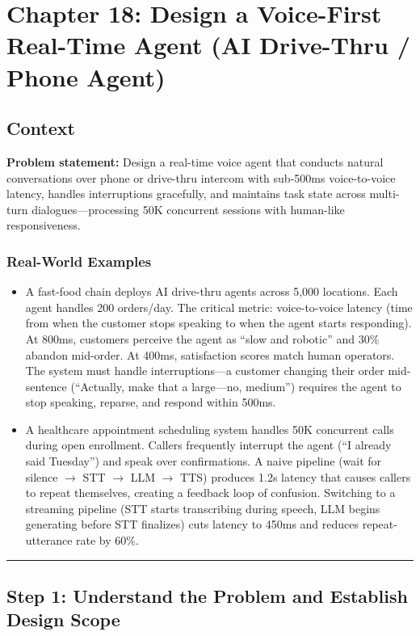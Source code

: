 \chapter{Chapter 18: Design a Voice-First Real-Time Agent (AI Drive-Thru / Phone Agent)}

\section*{Context}
\textbf{Problem statement:} Design a real-time voice agent that conducts natural conversations over phone or drive-thru intercom with sub-500ms voice-to-voice latency, handles interruptions gracefully, and maintains task state across multi-turn dialogues---processing 50K concurrent sessions with human-like responsiveness.

\subsection*{Real-World Examples}
\begin{itemize}
  \item A fast-food chain deploys AI drive-thru agents across 5,000 locations. Each agent handles 200 orders/day. The critical metric: voice-to-voice latency (time from when the customer stops speaking to when the agent starts responding). At 800ms, customers perceive the agent as ``slow and robotic'' and 30\% abandon mid-order. At 400ms, satisfaction scores match human operators. The system must handle interruptions---a customer changing their order mid-sentence (``Actually, make that a large---no, medium'') requires the agent to stop speaking, reparse, and respond within 500ms.
  \item A healthcare appointment scheduling system handles 50K concurrent calls during open enrollment. Callers frequently interrupt the agent (``I already said Tuesday'') and speak over confirmations. A naive pipeline (wait for silence $\rightarrow$ STT $\rightarrow$ LLM $\rightarrow$ TTS) produces 1.2s latency that causes callers to repeat themselves, creating a feedback loop of confusion. Switching to a streaming pipeline (STT starts transcribing during speech, LLM begins generating before STT finalizes) cuts latency to 450ms and reduces repeat-utterance rate by 60\%.
\end{itemize}

\bigskip\hrule\bigskip

\section*{Step 1: Understand the Problem and Establish Design Scope}


